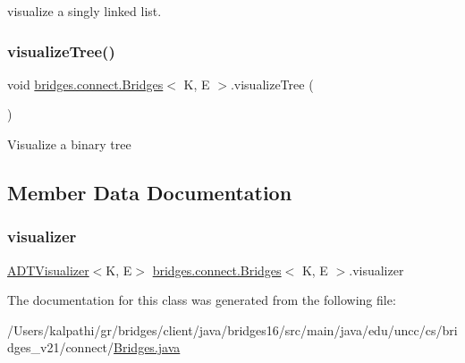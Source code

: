 visualize a singly linked list. \hypertarget{classbridges_1_1connect_1_1_bridges_abd8fa1ef8d6c5d3e6c533ee069d24d85}{}\label{classbridges_1_1connect_1_1_bridges_abd8fa1ef8d6c5d3e6c533ee069d24d85} 
\subsubsection{\texorpdfstring{visualize\+Tree()}{visualizeTree()}}
{\footnotesize\ttfamily void \hyperlink{classbridges_1_1connect_1_1_bridges}{bridges.\+connect.\+Bridges}$<$ K, E $>$.visualize\+Tree (\begin{DoxyParamCaption}{ }\end{DoxyParamCaption})\hspace{0.3cm}{\ttfamily [protected]}}

Visualize a binary tree 

\subsection{Member Data Documentation}
\hypertarget{classbridges_1_1connect_1_1_bridges_af3fc35779b31c976ed8bf2e173310502}{}\label{classbridges_1_1connect_1_1_bridges_af3fc35779b31c976ed8bf2e173310502} 
\subsubsection{\texorpdfstring{visualizer}{visualizer}}
{\footnotesize\ttfamily \hyperlink{classbridges_1_1base_1_1_a_d_t_visualizer}{A\+D\+T\+Visualizer}$<$K, E$>$ \hyperlink{classbridges_1_1connect_1_1_bridges}{bridges.\+connect.\+Bridges}$<$ K, E $>$.visualizer\hspace{0.3cm}{\ttfamily [protected]}}



The documentation for this class was generated from the following file\+:\begin{DoxyCompactItemize}
\item 
/\+Users/kalpathi/gr/bridges/client/java/bridges16/src/main/java/edu/uncc/cs/bridges\+\_\+v21/connect/\hyperlink{_bridges_8java}{Bridges.\+java}\end{DoxyCompactItemize}
